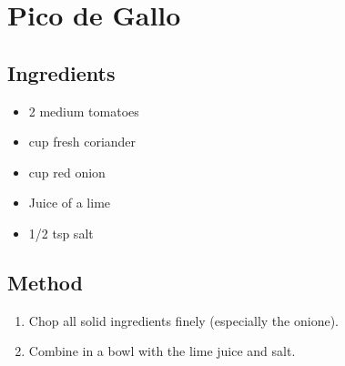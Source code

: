 \section{Pico de Gallo}
  \begin{multicols}{2}
    \subsection{Ingredients}
      \begin{itemize}
        \item 2 medium tomatoes
        \item {} cup fresh coriander
        \item {} cup red onion
        \item Juice of  a lime
        \item 1/2 tsp salt
      \end{itemize}
  \vfill\null
  \columnbreak
  \subsection{Method}
    \begin{enumerate}
      \item Chop all solid ingredients finely (especially the onione).
      \item Combine in a bowl with the lime juice and salt.
    \end{enumerate}
  \end{multicols}
